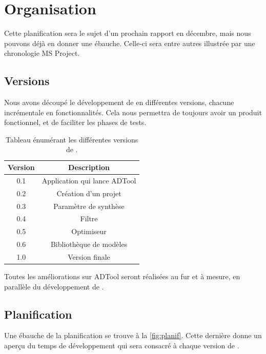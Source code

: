 \section{Organisation}
	 Cette planification sera le sujet d'un prochain rapport en décembre, mais nous pouvons déjà en donner une ébauche. Celle-ci sera entre autres illustrée par une chronologie MS Project.

	\subsection{Versions}
		Nous avons découpé le développement de \glasir en différentes versions, chacune incrémentale en fonctionnalités. Cela nous permettra de toujours avoir un produit fonctionnel, et de faciliter les phases de tests.

		\begin{table}[h!]
			\begin{center}
			\begin{tabular}{|c|c|}
				\hline
				Version & Description\\
				\hline
				0.1 & Application qui lance ADTool\\
				\hline
				0.2 & Création d'un projet\\
				\hline
				0.3 & Paramètre de synthèse\\
				\hline
				0.4 & Filtre\\
				\hline
				0.5 & Optimiseur\\
				\hline
				0.6 & Bibliothèque de modèles\\
				\hline
				1.0 & Version finale\\
				\hline
			\end{tabular}
			\end{center}
			\caption{Tableau énumérant les différentes versions de \glasir.}
		\end{table} %

		Toutes les améliorations sur ADTool seront réalisées au fur et à mesure, en parallèle du développement de \glasir.

	\subsection{Planification}
		Une ébauche de la planification se trouve à la {} \ref{fig:planif}. Cette dernière donne un aperçu du temps de développement qui sera consacré à chaque version de \glasir. 

